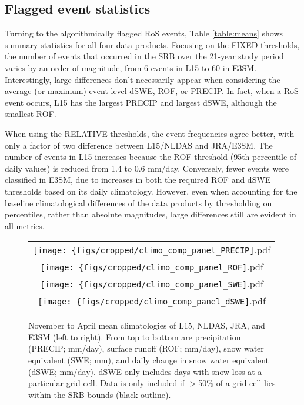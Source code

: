 \documentclass[draft]{agujournal2019}
\begin{document}
\subsection{Flagged event statistics}

Turning to the algorithmically flagged RoS events, Table \ref{table:means} shows summary statistics for all four data products. 
Focusing on the FIXED thresholds, the number of events that occurred in the SRB over the 21-year study period varies by an order of magnitude, from 6 events in L15 to 60 in E3SM.
Interestingly, large differences don't necessarily appear when considering the average (or maximum) event-level dSWE, ROF, or PRECIP. 
In fact, when a RoS event occurs, L15 has the largest PRECIP and largest dSWE, although the smallest ROF.

When using the RELATIVE thresholds, the event frequencies agree better, with only a factor of two difference between L15/NLDAS and JRA/E3SM. 
The number of events in L15 increases because the ROF threshold (95th percentile of daily values) is reduced from 1.4 to 0.6 mm/day. 
Conversely, fewer events were classified in E3SM, due to increases in both the required ROF and dSWE thresholds based on its daily climatology. 
However, even when accounting for the baseline climatological differences of the data products by thresholding on percentiles, rather than absolute magnitudes, large differences still are evident in all metrics.

\begin{figure}
\begin{tabular}{c}
\texttt{[image: \{figs/cropped/climo\_comp\_panel\_PRECIP]}.pdf} \\
\texttt{[image: \{figs/cropped/climo\_comp\_panel\_ROF]}.pdf} \\
\texttt{[image: \{figs/cropped/climo\_comp\_panel\_SWE]}.pdf} \\
\texttt{[image: \{figs/cropped/climo\_comp\_panel\_dSWE]}.pdf}
\end{tabular}
\caption{November to April mean climatologies of L15, NLDAS, JRA, and E3SM (left to right). From top to bottom are precipitation (PRECIP; mm/day), surface runoff (ROF; mm/day), snow water equivalent (SWE; mm), and daily change in snow water equivalent (dSWE; mm/day). dSWE only includes days with snow loss at a particular grid cell. Data is only included if $>$50\% of a grid cell lies within the SRB bounds (black outline).}
\label{fig:means}
\end{figure}
\end{document}
